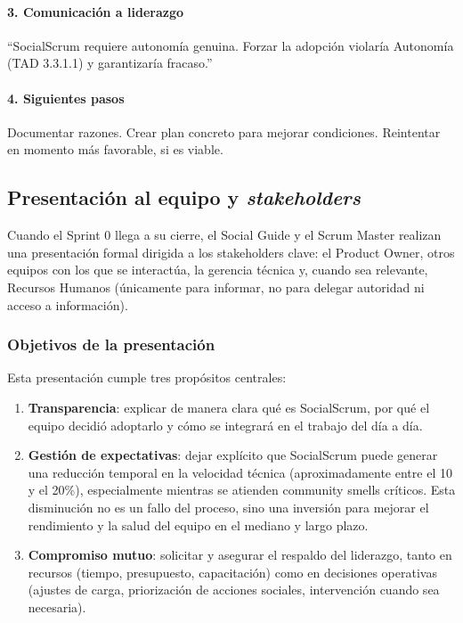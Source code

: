 \paragraph{3. Comunicación a liderazgo}
``SocialScrum requiere autonomía genuina. Forzar la adopción violaría Autonomía (TAD 3.3.1.1) y garantizaría fracaso.''

\paragraph{4. Siguientes pasos}
Documentar razones. Crear plan concreto para mejorar condiciones. Reintentar en momento más favorable, si es viable.

\subsection{Presentación al equipo y \textit{stakeholders}}

Cuando el Sprint 0 llega a su cierre, el Social Guide y el Scrum Master realizan una presentación formal dirigida a los stakeholders clave: el Product Owner, otros equipos con los que se interactúa, la gerencia técnica y, cuando sea relevante, Recursos Humanos (únicamente para informar, no para delegar autoridad ni acceso a información).

\subsubsection{Objetivos de la presentación}

Esta presentación cumple tres propósitos centrales:

\begin{enumerate}
    \item \textbf{Transparencia}: explicar de manera clara qué es SocialScrum, por qué el equipo decidió adoptarlo y cómo se integrará en el trabajo del día a día.

    \item \textbf{Gestión de expectativas}: dejar explícito que SocialScrum puede generar una reducción temporal en la velocidad técnica (aproximadamente entre el 10 y el 20\%), especialmente mientras se atienden community smells críticos. Esta disminución no es un fallo del proceso, sino una inversión para mejorar el rendimiento y la salud del equipo en el mediano y largo plazo.

    \item \textbf{Compromiso mutuo}: solicitar y asegurar el respaldo del liderazgo, tanto en recursos (tiempo, presupuesto, capacitación) como en decisiones operativas (ajustes de carga, priorización de acciones sociales, intervención cuando sea necesaria).
\end{enumerate}

